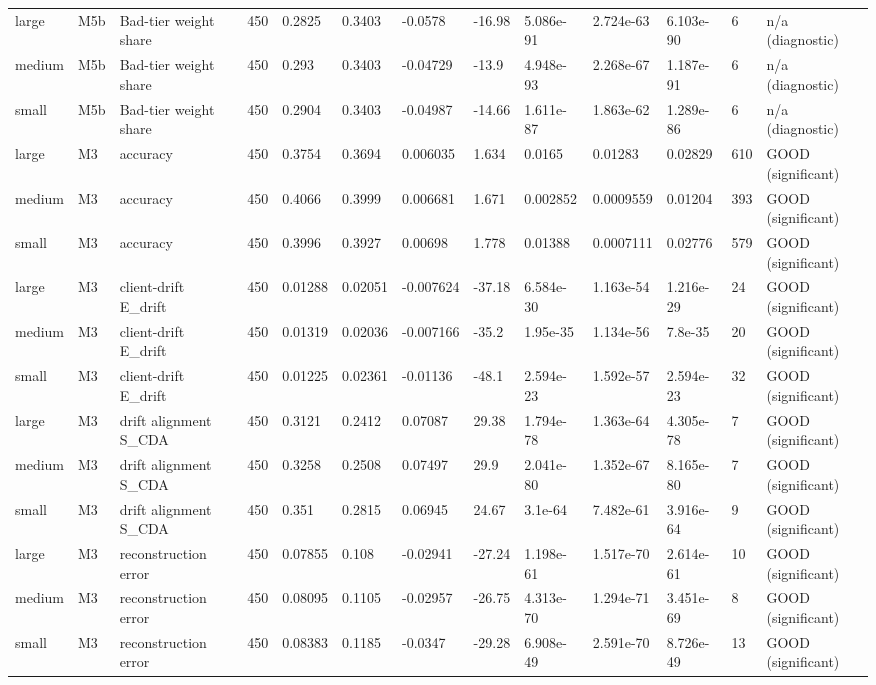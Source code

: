 \begin{table}[t]
\begin{tabular}{lllllllllllll}
large & M5b & Bad-tier weight share & 450 & 0.2825 & 0.3403 & -0.0578 & -16.98 & 5.086e-91 & 2.724e-63 & 6.103e-90 & 6 & n/a (diagnostic) \\
medium & M5b & Bad-tier weight share & 450 & 0.293 & 0.3403 & -0.04729 & -13.9 & 4.948e-93 & 2.268e-67 & 1.187e-91 & 6 & n/a (diagnostic) \\
small & M5b & Bad-tier weight share & 450 & 0.2904 & 0.3403 & -0.04987 & -14.66 & 1.611e-87 & 1.863e-62 & 1.289e-86 & 6 & n/a (diagnostic) \\
large & M3 & accuracy & 450 & 0.3754 & 0.3694 & 0.006035 & 1.634 & 0.0165 & 0.01283 & 0.02829 & 610 & GOOD (significant) \\
medium & M3 & accuracy & 450 & 0.4066 & 0.3999 & 0.006681 & 1.671 & 0.002852 & 0.0009559 & 0.01204 & 393 & GOOD (significant) \\
small & M3 & accuracy & 450 & 0.3996 & 0.3927 & 0.00698 & 1.778 & 0.01388 & 0.0007111 & 0.02776 & 579 & GOOD (significant) \\
large & M3 & client-drift E\_drift & 450 & 0.01288 & 0.02051 & -0.007624 & -37.18 & 6.584e-30 & 1.163e-54 & 1.216e-29 & 24 & GOOD (significant) \\
medium & M3 & client-drift E\_drift & 450 & 0.01319 & 0.02036 & -0.007166 & -35.2 & 1.95e-35 & 1.134e-56 & 7.8e-35 & 20 & GOOD (significant) \\
small & M3 & client-drift E\_drift & 450 & 0.01225 & 0.02361 & -0.01136 & -48.1 & 2.594e-23 & 1.592e-57 & 2.594e-23 & 32 & GOOD (significant) \\
large & M3 & drift alignment S\_CDA & 450 & 0.3121 & 0.2412 & 0.07087 & 29.38 & 1.794e-78 & 1.363e-64 & 4.305e-78 & 7 & GOOD (significant) \\
medium & M3 & drift alignment S\_CDA & 450 & 0.3258 & 0.2508 & 0.07497 & 29.9 & 2.041e-80 & 1.352e-67 & 8.165e-80 & 7 & GOOD (significant) \\
small & M3 & drift alignment S\_CDA & 450 & 0.351 & 0.2815 & 0.06945 & 24.67 & 3.1e-64 & 7.482e-61 & 3.916e-64 & 9 & GOOD (significant) \\
large & M3 & reconstruction error & 450 & 0.07855 & 0.108 & -0.02941 & -27.24 & 1.198e-61 & 1.517e-70 & 2.614e-61 & 10 & GOOD (significant) \\
medium & M3 & reconstruction error & 450 & 0.08095 & 0.1105 & -0.02957 & -26.75 & 4.313e-70 & 1.294e-71 & 3.451e-69 & 8 & GOOD (significant) \\
small & M3 & reconstruction error & 450 & 0.08383 & 0.1185 & -0.0347 & -29.28 & 6.908e-49 & 2.591e-70 & 8.726e-49 & 13 & GOOD (significant) \\

\end{tabular}
\end{table}

